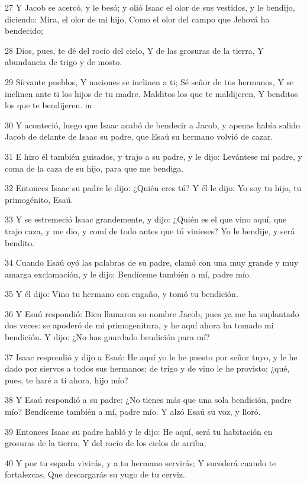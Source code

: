 27 Y Jacob se acercó, y le besó; y olió Isaac el olor de sus vestidos, y le bendijo, diciendo:
    Mira, el olor de mi hijo,
    Como el olor del campo que Jehová ha bendecido;

28 Dios, pues, te dé del rocío del cielo,
Y de las grosuras de la tierra,
Y abundancia de trigo y de mosto.

29 Sírvante pueblos,
Y naciones se inclinen a ti;
Sé señor de tus hermanos,
Y se inclinen ante ti los hijos de tu madre.
Malditos los que te maldijeren,
Y benditos los que te bendijeren. m

30 Y aconteció, luego que Isaac acabó de bendecir a Jacob, y apenas había salido Jacob de delante de Isaac su padre, que Esaú su hermano volvió de cazar.

31 E hizo él también guisados, y trajo a su padre, y le dijo: Levántese mi padre, y coma de la caza de su hijo, para que me bendiga.

32 Entonces Isaac su padre le dijo: ¿Quién eres tú? Y él le dijo: Yo soy tu hijo, tu primogénito, Esaú.

33 Y se estremeció Isaac grandemente, y dijo: ¿Quién es el que vino aquí, que trajo caza, y me dio, y comí de todo antes que tú vinieses? Yo le bendije, y será bendito.

34 Cuando Esaú oyó las palabras de su padre, clamó con una muy grande y muy amarga exclamación, y le dijo: Bendíceme también a mí, padre mío.

35 Y él dijo: Vino tu hermano con engaño, y tomó tu bendición.

36 Y Esaú respondió: Bien llamaron su nombre Jacob, pues ya me ha suplantado dos veces: se apoderó de mi primogenitura, y he aquí ahora ha tomado mi bendición. Y dijo: ¿No has guardado bendición para mí?

37 Isaac respondió y dijo a Esaú: He aquí yo le he puesto por señor tuyo, y le he dado por siervos a todos sus hermanos; de trigo y de vino le he provisto; ¿qué, pues, te haré a ti ahora, hijo mío?

38 Y Esaú respondió a su padre: ¿No tienes más que una sola bendición, padre mío? Bendíceme también a mí, padre mío. Y alzó Esaú su voz, y lloró.

39 Entonces Isaac su padre habló y le dijo:
    He aquí, será tu habitación en grosuras de la tierra,
    Y del rocío de los cielos de arriba;

40 Y por tu espada vivirás, y a tu hermano servirás;
Y sucederá cuando te fortalezcas,
Que descargarás su yugo de tu cerviz.

